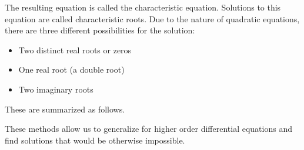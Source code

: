 \documentclass[12pt, landscape, twocolumn]{article}
\begin{document}
    The resulting equation is called the characteristic equation. Solutions to this equation are called characteristic roots. Due to the nature of quadratic equations, there are three different possibilities for the solution:

        \begin{itemize}
            \item Two distinct real roots or zeros
            \item One real root (a double root)
            \item Two imaginary roots
        \end{itemize}

    These are summarized as follows.

        \begin{table}[ht]
            \centering
            \caption{Roots for Second Order Differential Equations in Characteristic Equation Form}
            \label{table:roots}
        \end{table}

    These methods allow us to generalize for higher order differential equations and find solutions that would be otherwise impossible.
\end{document}
